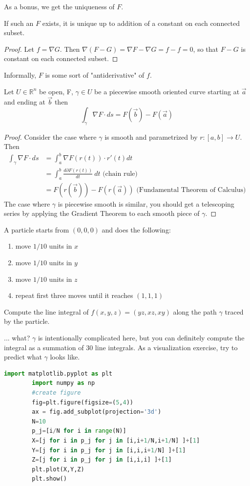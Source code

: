 \documentclass[11pt,openany]{book}
\newcommand{\proposition}[1]{\begin{tcolorbox}[title=Proposition,colframe=red!50!blue!20!white,colback=red!35!blue!10!white, coltitle=black]{#1}\end{tcolorbox}
}
\newcommand{\theorem}[2]{\begin{tcolorbox}[title=Theorem ({#1}),colframe=red!70!black,colback=red!5!white]{#2}\end{tcolorbox}
}
\newcommand{\example}[1]{\begin{tcolorbox}[title=Example,colframe=yellow!50!white,colback=yellow!20!white,coltitle=black]{#1}\end{tcolorbox}
}
\begin{document}
	
	As a bonus, we get the uniqueness of $F$.
	\proposition{
		If such an $F$ exists, it is unique up to addition of a constant on each connected subset.
	}
	
	\begin{proof}
		Let $f=\nabla G$. Then $\nabla(F-G)=\nabla F - \nabla G = f-f =0$, so that $F-G$ is constant on each connected subset.
	\end{proof}
	Informally, $F$ is some sort of "antiderivative" of $f$.
	\theorem{Gradient}{
		Let $U\in\mathbb{R}^n$ be open, F, $\gamma\in U$ be a piecewise smooth oriented curve starting at $\vec{a}$ and ending at $\vec{b}$
		then \[
		\int_\gamma \nabla F \cdot ds = F(\vec{b})-F(\vec{a})
		\]
	}
	\begin{proof}
		Consider the case where $\gamma$ is smooth and parametrized by $r:[a,b]\to U$. Then
		\begin{align*}
			\int_\gamma \nabla F \cdot ds &= \int_a^b \nabla F(r(t)) \cdot r'(t) dt \\
			&= \int_a^b \frac{d \partial F(r(t))}{dt} \ dt \textrm{ (chain rule)}\\
			&= F(r(\vec{b})) - F(r(\vec{a})) \textrm{ (Fundamental Theorem of Calculus)}
		\end{align*} 
		The case where $\gamma$ is piecewise smooth is similar, you should get a telescoping series by applying the Gradient Theorem to each smooth piece of $\gamma$.
	\end{proof}
	\example{
		A particle starts from $(0,0,0)$ and does the following:
		\begin{enumerate}
			\item move $1/10$ units in $x$
			\item move $1/10$ units in $y$
			\item move $1/10$ units in $z$
			\item repeat first three moves until it reaches $(1,1,1)$
		\end{enumerate}
		Compute the line integral of $f(x,y,z)= (yz,xz,xy)$ along the path $\gamma$ traced by the particle.
	}
	... what? $\gamma$ is intentionally complicated here, but you can definitely compute the integral as a summation of $30$ line integrals.
	As a visualization exercise, try to predict what $\gamma$ looks like.
	
	\begin{lstlisting}[language=Python]
		import matplotlib.pyplot as plt
		import numpy as np
		#create figure
		fig=plt.figure(figsize=(5,4))
		ax = fig.add_subplot(projection='3d')
		N=10
		p_j=[i/N for i in range(N)]
		X=[j for i in p_j for j in [i,i+1/N,i+1/N] ]+[1]
		Y=[j for i in p_j for j in [i,i,i+1/N] ]+[1]
		Z=[j for i in p_j for j in [i,i,i] ]+[1]
		plt.plot(X,Y,Z)
		plt.show()
	\end{lstlisting}
	
\end{document}
